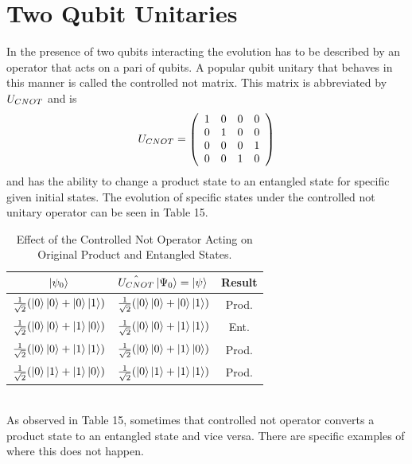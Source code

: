 \documentclass[twocolumn]{article}
\begin{document}
\section*{Two Qubit Unitaries}
In the presence of two qubits interacting the evolution has to be described by an operator that acts on a pari of qubits. A popular qubit unitary that behaves in this manner is called the controlled not matrix. This matrix is abbreviated by $U_{\tiny{CNOT}}$ and is
\begin{equation}
U_{\tiny{CNOT}}=
\left(\begin{array}{cccc}
1 & 0 & 0 & 0 \\
0 & 1 & 0 & 0 \\
0 & 0 & 0 & 1 \\
0 & 0 & 1 & 0 \\
\end{array}\right)
\end{equation}
and has the ability to change a product state to an entangled state for specific given initial states. The evolution of specific states under the controlled not unitary operator can be seen in Table 15.
\begin{table}[h!]
\begin{center}
\begin{tabular}{ |c|c|c| }
\hline $\ket{\psi_0}$ & $\hat{U_{CNOT}}\ket{\Psi_0}=\ket{\psi}$ & Result \\
\hline $\frac{1}{\sqrt{2}}(\ket{0}\ket{0}+\ket{0}\ket{1})$ & $\frac{1}{\sqrt{2}}(\ket{0}\ket{0}+\ket{0}\ket{1})$ & Prod. \\
\hline $\frac{1}{\sqrt{2}}(\ket{0}\ket{0}+\ket{1}\ket{0})$ & $\frac{1}{\sqrt{2}}(\ket{0}\ket{0}+\ket{1}\ket{1})$ & Ent. \\
\hline $\frac{1}{\sqrt{2}}(\ket{0}\ket{0}+\ket{1}\ket{1})$ & $\frac{1}{\sqrt{2}}(\ket{0}\ket{0}+\ket{1}\ket{0})$ & Prod. \\
\hline $\frac{1}{\sqrt{2}}(\ket{0}\ket{1}+\ket{1}\ket{0})$ & $\frac{1}{\sqrt{2}}(\ket{0}\ket{1}+\ket{1}\ket{1})$ & Prod. \\
\hline 
\end{tabular}
\caption{Effect of the Controlled Not Operator Acting on Original Product and Entangled States.}
\end{center}
\end{table} \\
As observed in Table 15, sometimes that controlled not operator converts a product state to an entangled state and vice versa. There are specific examples of where this does not happen.
\end{document}
